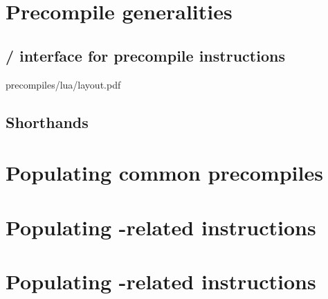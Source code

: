 \section{Precompile generalities}                                          \label{oob: populating: precompiles}
\subsection{\hubMod{} / \oobMod{} interface for precompile instructions}   \label{oob: hub / oob interface for precompiles}   {precompiles/lua/layout.pdf}
\subsection{Shorthands}                                                    \label{oob: populating: shorthands}                                               
\section{Populating common precompiles}                                    \label{oob: populating: common precompiles}                                   
\section{Populating -related \oobMod{} instructions}          \label{oob: populating: modexp}                                               
\section{Populating -related \oobMod{} instructions}         \label{oob: populating: blake2f}                                             
